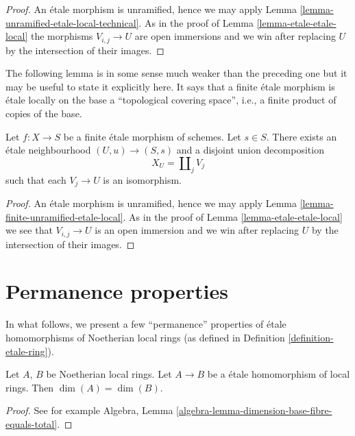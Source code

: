 \begin{proof}
An \'etale morphism is unramified, hence we may apply
Lemma \ref{lemma-unramified-etale-local-technical}.
As in the proof of
Lemma \ref{lemma-etale-etale-local}
the morphisms $V_{i, j} \to U$ are open immersions and
we win after replacing $U$ by the intersection of their
images.
\end{proof}

\noindent
The following lemma is in some sense much weaker than the preceding one
but it may be useful to state it explicitly here. It says that a finite
\'etale morphism is \'etale locally on the base a
``topological covering space'', i.e., a finite product of copies of the base.

\begin{lemma}
\label{lemma-finite-etale-etale-local}
Let $f : X \to S$ be a finite \'etale morphism of schemes.
Let $s \in S$. There exists an \'etale neighbourhood $(U, u) \to (S, s)$
and a disjoint union decomposition
$$
X_U = \coprod\nolimits_j V_j
$$
such that each $V_j \to U$ is an isomorphism.
\end{lemma}

\begin{proof}
An \'etale morphism is unramified, hence we may apply
Lemma \ref{lemma-finite-unramified-etale-local}.
As in the proof of
Lemma \ref{lemma-etale-etale-local}
we see that $V_{i, j} \to U$ is an open immersion and we win
after replacing $U$ by the intersection of their images.
\end{proof}




\section{Permanence properties}
\label{section-properties-permanence}

\noindent
In what follows, we present a few ``permanence''
properties of \'etale homomorphisms of Noetherian local rings
(as defined in Definition \ref{definition-etale-ring}).

\begin{lemma}
\label{lemma-etale-dimension}
Let $A$, $B$ be Noetherian local rings.
Let $A \to B$ be a \'etale homomorphism of local rings.
Then $\dim(A) = \dim(B)$.
\end{lemma}

\begin{proof}
See for example
Algebra, Lemma \ref{algebra-lemma-dimension-base-fibre-equals-total}.
\end{proof}

